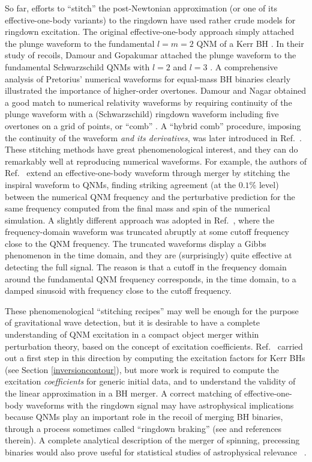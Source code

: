 \documentclass[]{iopart}
\begin{document}
So far, efforts to ``stitch'' the post-Newtonian approximation (or one of its
effective-one-body variants) to the ringdown have used rather crude models for
ringdown excitation.
%
The original effective-one-body approach simply attached the plunge waveform
to the fundamental $l=m=2$ QNM of a Kerr BH \cite{Buonanno:2000ef}.  In their
study of recoils, Damour and Gopakumar attached the plunge waveform to the
fundamental Schwarzschild QNMs with $l=2$ and $l=3$ \cite{Damour:2006tr}.  A
comprehensive analysis of Pretorius' numerical waveforms for equal-mass BH
binaries \cite{Buonanno:2006ui} clearly illustrated the importance of
higher-order overtones.  Damour and Nagar obtained a good match to numerical
relativity waveforms by requiring continuity of the plunge waveform with a
(Schwarzschild) ringdown waveform including five overtones on a grid of
points, or ``comb'' \cite{Damour:2007xr}. A ``hybrid comb'' procedure,
imposing the continuity of the waveform {\it and its derivatives}, was later
introduced in Ref.~\cite{Buonanno:2009qa}.  These stitching methods have great
phenomenological interest, and they can do remarkably well at reproducing
numerical waveforms.  For example, the authors of Ref.~\cite{Buonanno:2009qa}
extend an effective-one-body waveform through merger by stitching the inspiral
waveform to QNMs, finding striking agreement (at the $0.1\%$ level) between
the numerical QNM frequency and the perturbative prediction for the same
frequency computed from the final mass and spin of the numerical simulation. A
slightly different approach was adopted in Ref.~\cite{Pan:2007nw}, where the
frequency-domain waveform was truncated abruptly at some cutoff frequency
close to the QNM frequency. The truncated waveforms display a Gibbs phenomenon
in the time domain, and they are (surprisingly) quite effective at detecting
the full signal. The reason is that a cutoff in the frequency domain around
the fundamental QNM frequency corresponds, in the time domain, to a damped
sinusoid with frequency close to the cutoff frequency.

These phenomenological ``stitching recipes'' may well be enough for the
purpose of gravitational wave detection, but it is desirable to have a
complete understanding of QNM excitation in a compact object merger within
perturbation theory, based on the concept of excitation
coefficients. Ref.~\cite{Berti:2006wq} carried out a first step in this
direction by computing the excitation factors for Kerr BHs (see Section
\ref{inversioncontour}), but more work is required to compute the excitation
{\it coefficients} for generic initial data, and to understand the
validity of the linear approximation in a BH merger. A correct matching of
effective-one-body waveforms with the ringdown signal may have astrophysical
implications because QNMs play an important role in the recoil of merging BH
binaries, through a process sometimes called ``ringdown braking'' (see
\cite{Blanchet:2005rj,Damour:2006tr,Schnittman:2007ij} and references
therein). A complete analytical description of the merger of spinning,
precessing binaries would also prove useful for statistical studies of
astrophysical relevance ~\cite{Schnittman:2007sn}.
\end{document}
